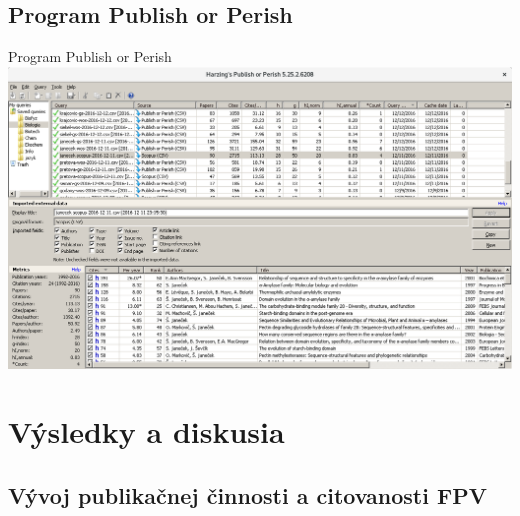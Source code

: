\documentclass{beamer}
\begin{document}
\subsection{Program Publish or Perish}

%
%
\begin{frame}{Program Publish or Perish}
  \includegraphics[scale=0.255]{publish-or-perish_wine.png} \\[-1ex]
  \parbox{\textwidth}{\centering\tiny \citet{Harzing2011}}
\end{frame}



%
%



\section{Výsledky a diskusia}

\subsection{Vývoj publikačnej činnosti a citovanosti FPV}
\end{document}
